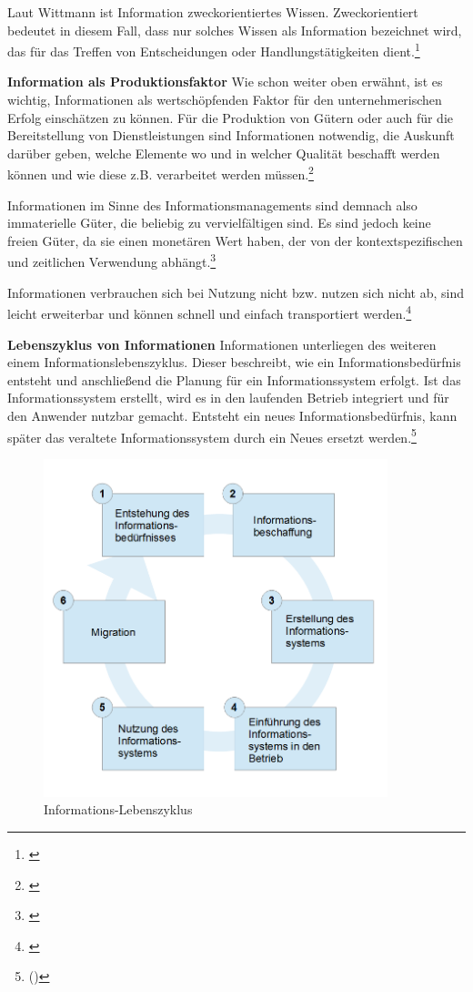 Laut Wittmann ist Information zweckorientiertes Wissen. Zweckorientiert bedeutet in diesem Fall, dass nur solches Wissen als Information bezeichnet wird, das für das Treffen von Entscheidungen oder Handlungstätigkeiten dient.\footnote{\cite{wittmann_unternehmung_1959}}

\textbf{Information als Produktionsfaktor}
Wie schon weiter oben erwähnt, ist es wichtig, Informationen als wertschöpfenden Faktor für den unternehmerischen Erfolg einschätzen zu können. Für die Produktion von Gütern oder auch für die Bereitstellung von Dienstleistungen sind Informationen notwendig, die Auskunft darüber geben, welche Elemente wo und in welcher Qualität beschafft werden können und wie diese z.B. verarbeitet werden müssen.\footnote{\cite{bode_informationsbegriff_1997}}

Informationen im Sinne des Informationsmanagements sind demnach also immaterielle Güter, die beliebig zu vervielfältigen sind. Es sind jedoch keine freien Güter, da sie einen monetären Wert haben, der von der kontextspezifischen und zeitlichen Verwendung abhängt.\footnote{\cite{krcmar_informationsmanagement_2015}}

Informationen verbrauchen sich bei Nutzung nicht bzw. nutzen sich nicht ab, sind leicht erweiterbar und können schnell und einfach transportiert werden.\footnote{\cite{teubner_information_2005}}

\textbf{Lebenszyklus von Informationen}
Informationen unterliegen des weiteren einem Informationslebenszyklus. Dieser beschreibt, wie ein Informationsbedürfnis entsteht und anschließend die Planung für ein Informationssystem erfolgt. Ist das Informationssystem erstellt, wird es in den laufenden Betrieb integriert und für den Anwender nutzbar gemacht. Entsteht ein neues Informationsbedürfnis, kann später das veraltete Informationssystem durch ein Neues ersetzt werden.\footnote{(\cite{dippold_datenmanagement_2005})}

\begin{figure}[h!]
	\centering
	\includegraphics[width=10cm]{kapitel/gruppe1_1/bilder/informations-lebenszyklus}
	\caption{Informations-Lebenszyklus}
	\label{fig_informations_lebenszyklus}
\end{figure}

